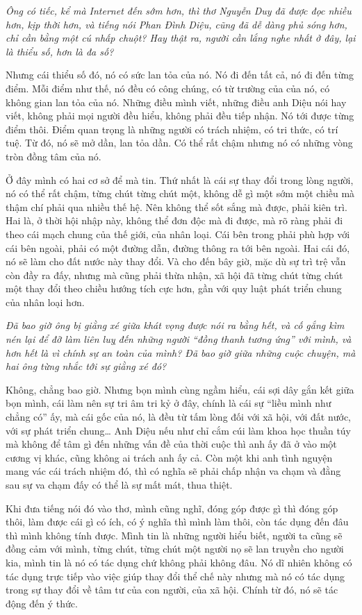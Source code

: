 \emph{Ông có tiếc, kể mà Internet đến sớm hơn, thì thơ Nguyễn Duy đã được đọc nhiều hơn, kịp thời hơn, và tiếng nói Phan Đình Diệu, cũng đã dễ dàng phủ sóng hơn, chỉ cần bằng một cú nhấp chuột? Hay thật ra, người cần lắng nghe nhất ở đây, lại là thiểu số, hơn là đa số?}

Nhưng cái thiểu số đó, nó có sức lan tỏa của nó. Nó đi đến tất cả, nó đi đến từng điểm. Mỗi điểm như thế, nó đều có công chúng, có từ trường của của nó, có không gian lan tỏa của nó. Những điều mình viết, những điều anh Diệu nói hay viết, không phải mọi người đều hiểu, không phải đều tiếp nhận. Nó tới được từng điểm thôi. Điểm quan trọng là những người có trách nhiệm, có tri thức, có trí tuệ. Từ đó, nó sẽ mở dần, lan tỏa dần. Có thể rất chậm nhưng nó có những vòng tròn đồng tâm của nó.

Ở đây mình có hai cơ sở để mà tin. Thứ nhất là cái sự thay đổi trong lòng người, nó có thể rất chậm, từng chút từng chút một, không dễ gì một sớm một chiều mà thậm chí phải qua nhiều thế hệ. Nên không thể sốt sắng mà được, phải kiên trì. Hai là, ở thời hội nhập này, không thể đơn độc mà đi được, mà rõ ràng phải đi theo cái mạch chung của thế giới, của nhân loại. Cái bên trong phải phù hợp với cái bên ngoài, phải có một đường dẫn, đường thông ra tới bên ngoài. Hai cái đó, nó sẽ làm cho đất nước này thay đổi. Và cho đến bây giờ, mặc dù sự trì trệ vẫn còn đầy ra đấy, nhưng mà cũng phải thừa nhận, xã hội đã từng chút từng chút một thay đổi theo chiều hướng tích cực hơn, gần với quy luật phát triển chung của nhân loại hơn.

\emph{Đã bao giờ ông bị giằng xé giữa khát vọng được nói ra bằng hết, và cố gắng kìm nén lại để đỡ làm liên luỵ đến những người “đồng thanh tương ứng” với mình, và hơn hết là vì chính sự an toàn của mình? Đã bao giờ giữa những cuộc chuyện, mà hai ông từng nhắc tới sự giằng xé đó?}

Không, chẳng bao giờ. Nhưng bọn mình cùng ngầm hiểu, cái sợi dây gắn kết giữa bọn mình, cái làm nên sự tri âm tri kỷ ở đây, chính là cái sự “liều mình như chẳng có” ấy, mà cái gốc của nó, là đều từ tấm lòng đối với xã hội, với đất nước, với sự phát triển chung… Anh Diệu nếu như chỉ cắm cúi làm khoa học thuần túy mà không để tâm gì đến những vấn đề của thời cuộc thì anh ấy đã ở vào một cương vị khác, cũng không ai trách anh ấy cả. Còn một khi anh tình nguyện mang vác cái trách nhiệm đó, thì có nghĩa sẽ phải chấp nhận va chạm và đằng sau sự va chạm đấy có thể là sự mất mát, thua thiệt.

Khi đưa tiếng nói đó vào thơ, mình cũng nghĩ, đóng góp được gì thì đóng góp thôi, làm được cái gì có ích, có ý nghĩa thì mình làm thôi, còn tác dụng đến đâu thì mình không tính được. Mình tin là những người hiểu biết, người ta cũng sẽ đồng cảm với mình, từng chút, từng chút một người nọ sẽ lan truyền cho người kia, mình tin là nó có tác dụng chứ không phải không đâu. Nó dĩ nhiên không có tác dụng trực tiếp vào việc giúp thay đổi thể chế này nhưng mà nó có tác dụng trong sự thay đổi về tâm tư của con người, của xã hội. Chính từ đó, nó sẽ tác động đến ý thức.


